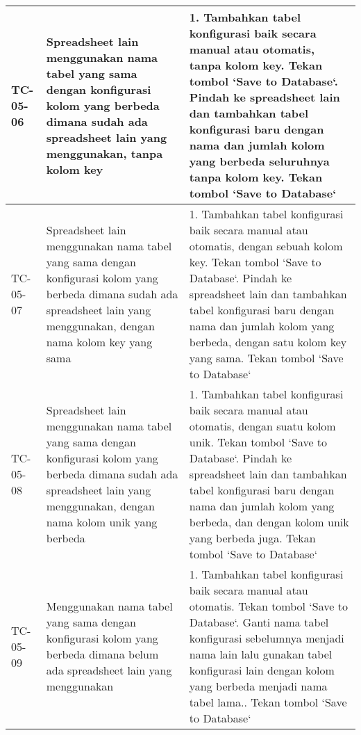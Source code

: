 \begin{small}
\begin{longtable}{ | p{2cm} | p{4cm} | p{7cm} | }
	TC-05-06 & Spreadsheet lain menggunakan nama tabel yang sama dengan konfigurasi kolom yang berbeda dimana sudah ada spreadsheet lain yang menggunakan, tanpa kolom key & 1. Tambahkan tabel konfigurasi baik secara manual atau otomatis, tanpa kolom key\newline 2. Tekan tombol `Save to Database`\newline 3. Pindah ke spreadsheet lain dan tambahkan tabel konfigurasi baru dengan nama dan jumlah kolom yang berbeda seluruhnya tanpa kolom key\newline 4. Tekan tombol `Save to Database`\newline \\ \hline 
	TC-05-07 & Spreadsheet lain menggunakan nama tabel yang sama dengan konfigurasi kolom yang berbeda dimana sudah ada spreadsheet lain yang menggunakan, dengan nama kolom key yang sama & 1. Tambahkan tabel konfigurasi baik secara manual atau otomatis, dengan sebuah kolom key\newline 2. Tekan tombol `Save to Database`\newline 3. Pindah ke spreadsheet lain dan tambahkan tabel konfigurasi baru dengan nama dan jumlah kolom yang berbeda, dengan satu kolom key yang sama\newline 4. Tekan tombol `Save to Database`\newline \\ \hline 
	TC-05-08 & Spreadsheet lain menggunakan nama tabel yang sama dengan konfigurasi kolom yang berbeda dimana sudah ada spreadsheet lain yang menggunakan, dengan nama kolom unik yang berbeda & 1. Tambahkan tabel konfigurasi baik secara manual atau otomatis, dengan suatu kolom unik\newline 2. Tekan tombol `Save to Database`\newline 3. Pindah ke spreadsheet lain dan tambahkan tabel konfigurasi baru dengan nama dan jumlah kolom yang berbeda, dan dengan kolom unik yang berbeda juga\newline 4. Tekan tombol `Save to Database`\newline \\ \hline 
	TC-05-09 & Menggunakan nama tabel yang sama dengan konfigurasi kolom yang berbeda dimana belum ada spreadsheet lain yang menggunakan & 1. Tambahkan tabel konfigurasi baik secara manual atau otomatis\newline 2. Tekan tombol `Save to Database`\newline 3. Ganti nama tabel konfigurasi sebelumnya menjadi nama lain lalu gunakan tabel konfigurasi lain dengan kolom yang berbeda menjadi nama tabel lama.\newline 4. Tekan tombol `Save to Database`\newline \\ \hline 

\end{longtable}
\end{small}
